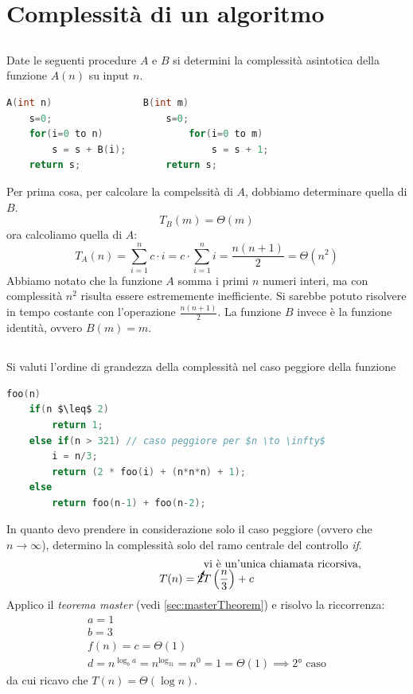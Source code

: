 \documentclass[italian]{article}
\newcommand{\fn}{f(n)}
\newcommand{\exercize}{\text{\faPencil $\;$ Esercizio }}
\begin{document}
\section{Complessità di un algoritmo}
\subsection{\exercize}
Date le seguenti procedure $A$ e $B$ si determini la complessità asintotica della funzione $A(n)$ su input $n$.
\begin{lstlisting}[language=c,mathescape=true]
A(int n)				B(int m)
	s=0;					s=0;
	for(i=0 to n)				for(i=0 to m)
		s = s + B(i);				s = s + 1;
	return s;				return s;
\end{lstlisting}
Per prima cosa, per calcolare la compelssità di $A$, dobbiamo determinare quella di $B$.
\[
	T_B(m) = \varTheta(m) 
\]
ora calcoliamo quella di $A$:
\[
	T_A(n) = \sum_{i=1}^{n}c\cdot i = c \cdot \sum_{i=1}^{n} i = \frac{n(n+1)}{2} = \varTheta(n^2) 
\]
Abbiamo notato che la funzione $A$ somma i primi $n$ numeri interi, ma con complessità $n^2$ risulta essere estrememente inefficiente. Si sarebbe potuto risolvere in tempo costante con l'operazione $\frac{n(n+1)}{2}$. La funzione $B$ invece è la funzione identità, ovvero $B(m) = m$.

\subsection{\exercize}
Si valuti l'ordine di grandezza della complessità nel caso peggiore della funzione
\begin{lstlisting}[language=c,mathescape=true]
foo(n)
	if(n $\leq$ 2)
		return 1;
	else if(n > 321) // caso peggiore per $n \to \infty$
		i = n/3;
		return (2 * foo(i) + (n*n*n) + 1);
	else
		return foo(n-1) + foo(n-2);
\end{lstlisting}
In quanto devo prendere in considerazione solo il caso peggiore (ovvero che $n \to \infty$), determino la complessità solo del ramo centrale del controllo \textit{if}.
\[
	T(n) = \cancelto{\text{vi è un'unica chiamata ricorsiva, non 2}}{2}T\left(\frac{n}{3}\right) + c
\]
Applico il \textit{teorema master} (vedi \ref{sec:masterTheorem})  e risolvo la riccorrenza:
\begin{gather*}
	a = 1\\
	b = 3 \\
	\fn = c = \varTheta(1) \\
	d = n^{\log_ba} = n^{\log_31} = n^0 = 1 = \varTheta(1) \implies \text{2° caso}
\end{gather*}
da cui ricavo che $T(n) = \varTheta(\log n)$.
\pagebreak
\end{document}
